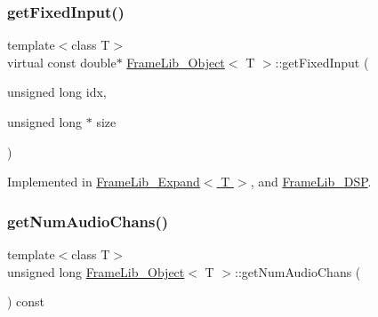 \mbox{\label{class_frame_lib___object_ab34877668c8b6a2ca5efa6bc10368820}} 
\subsubsection{\texorpdfstring{get\+Fixed\+Input()}{getFixedInput()}}
{\footnotesize\ttfamily template$<$class T$>$ \\
virtual const double$\ast$ \hyperlink{class_frame_lib___object}{Frame\+Lib\+\_\+\+Object}$<$ T $>$\+::get\+Fixed\+Input (\begin{DoxyParamCaption}\item[{unsigned long}]{idx,  }\item[{unsigned long $\ast$}]{size }\end{DoxyParamCaption})\hspace{0.3cm}{\ttfamily [pure virtual]}}



Implemented in \hyperlink{class_frame_lib___expand_aea5cb729f1e2e69c5db41b53a991e0c6}{Frame\+Lib\+\_\+\+Expand$<$ T $>$}, and \hyperlink{class_frame_lib___d_s_p_aabcf3bae08ab571f455f08bd7cf5e625}{Frame\+Lib\+\_\+\+D\+SP}.

\mbox{\label{class_frame_lib___object_a59e6e7dba2d18444be6d5fbee15c73f2}} 
\subsubsection{\texorpdfstring{get\+Num\+Audio\+Chans()}{getNumAudioChans()}}
{\footnotesize\ttfamily template$<$class T$>$ \\
unsigned long \hyperlink{class_frame_lib___object}{Frame\+Lib\+\_\+\+Object}$<$ T $>$\+::get\+Num\+Audio\+Chans (\begin{DoxyParamCaption}{ }\end{DoxyParamCaption}) const\hspace{0.3cm}{\ttfamily [inline]}}

\mbox{\label{class_frame_lib___object_ad29b6281916a933c5baa43cbb7d11efd}} 
